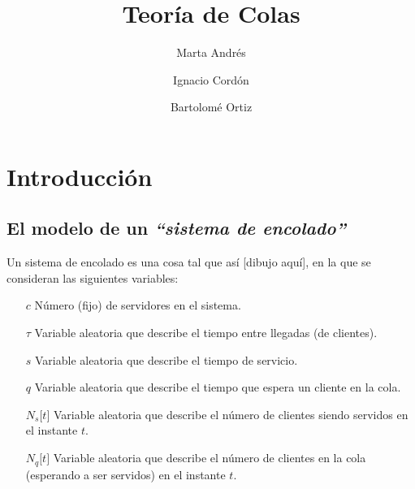 \documentclass[a4paper,10pt]{scrartcl}
\title{Teoría de Colas}
\author{
  Marta Andrés\and
  Ignacio Cordón\and
  Bartolomé Ortiz\and
}
\date{}
\numberwithin{equation}{section}
\begin{document}
\maketitle
\tableofcontents
\pagebreak

\section{Introducción}

\subsection{El modelo de un \textit{``sistema de encolado''}}
Un sistema de encolado es una cosa tal que así [dibujo aquí], en la que se consideran las siguientes variables:


\begin{itemize}
\item [$c$]
  Número (fijo) de servidores en el sistema.
\item [$\tau$]
  Variable aleatoria que describe el tiempo entre llegadas (de clientes).
\item [$s$]
  Variable aleatoria que describe el tiempo de servicio.
\item [$q$]
  Variable aleatoria que describe el tiempo que espera un cliente en la cola.
\item [$N_s \lbrack t \rbrack$]
  Variable aleatoria que describe el número de clientes siendo servidos en el instante $t$.
\item [$N_q \lbrack t \rbrack$]
  Variable aleatoria que describe el número de clientes en la cola (esperando a ser servidos) en el instante $t$.
\end{itemize}

\end{document}
